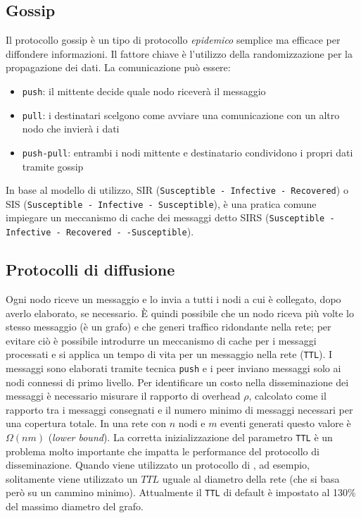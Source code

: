 \begin{appendices}
    \chapter{Gossip}\label{appendix:gossip}
    Il protocollo gossip è un tipo di protocollo \textit{epidemico} semplice ma efficace per diffondere informazioni. Il fattore chiave è l'utilizzo della randomizzazione per la propagazione dei dati.\newline
    La comunicazione può essere:
    \begin{itemize}
        \item \texttt{push}: il mittente decide quale nodo riceverà il messaggio
        \item \texttt{pull}: i destinatari scelgono come avviare una comunicazione con un altro nodo che invierà i dati
        \item \texttt{push-pull}: entrambi i nodi mittente e destinatario condividono i propri dati tramite gossip
    \end{itemize}
    In base al modello di utilizzo, SIR (\texttt{Susceptible - Infective - Recovered}) o SIS (\texttt{Susceptible - Infective - Susceptible}), è una pratica comune impiegare un meccanismo di cache dei messaggi detto SIRS (\texttt{Susceptible - Infective - Recovered - -Susceptible}).
    
    \section{Protocolli di diffusione}
    Ogni nodo riceve un messaggio e lo invia a tutti i nodi a cui è collegato, dopo averlo elaborato, se necessario. È quindi possibile che un nodo riceva più volte lo stesso messaggio (è un grafo) e che generi traffico ridondante nella rete; per evitare ciò è possibile introdurre un meccanismo di cache per i messaggi processati e si applica un tempo di vita per un messaggio nella rete (\texttt{TTL}).\newline
    I messaggi sono elaborati tramite tecnica \texttt{push} e i peer inviano messaggi solo ai nodi connessi di primo livello.\newline
    Per identificare un costo nella disseminazione dei messaggi è necessario misurare il rapporto di overhead $\rho$, calcolato come il rapporto tra i messaggi consegnati e il numero minimo di messaggi necessari per una copertura totale. In una rete con $n$ nodi e $m$ eventi generati questo valore è $\Omega(nm)$ (\textit{lower bound}).\newline
    La corretta inizializzazione del parametro \texttt{TTL} è un problema molto importante che impatta le performance del protocollo di disseminazione. Quando viene utilizzato un protocollo di , ad esempio, solitamente viene utilizzato un $TTL$ uguale al diametro della rete (che si basa però su un cammino minimo). Attualmente il \texttt{TTL} di default è impostato al 130\% del massimo diametro del grafo.
    

\end{appendices}
